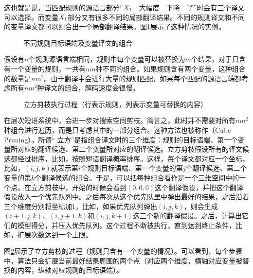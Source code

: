 \parinterval 这也就是说，当匹配规则的源语言部分“${X}_1$\ \ 大幅度\ \ 下降\ \ 了”时会有三个译文可以选择。而变量${X}_1$部分又有很多不同的局部翻译结果。不同的规则译文和不同的变量译文都可以组合出一个局部翻译结果。图\ref{fig:8-12}展示了这种情况的实例。

\begin{figure}[htp]
\centering

\caption{不同规则目标语端及变量译文的组合}
\label{fig:8-12}
\end{figure}

\parinterval 假设有$n$个规则源语言端相同，规则中每个变量可以被替换为$m$个结果，对于只含有一个变量的规则，一共有$nm$种不同的组合。如果规则含有两个变量，这种组合的数量是$n{m}^2$。由于翻译中会进行大量的规则匹配，如果每个匹配的源语言端都考虑所有$n{m}^2$种译文的组合，解码速度会很慢。

\begin{figure}[htp]
\centering

\caption{立方剪枝执行过程（行表示规则，列表示变量可替换的内容）}
\label{fig:8-13}
\end{figure}

\parinterval 在层次短语系统中，会进一步对搜索空间剪枝。简言之，此时并不需要对所有$n{m}^2$种组合进行遍历，而是只考虑其中的一部分组合。这种方法也被称作{\small{}}（Cube Pruning）。所谓“ 立方”是指组合译文时的三个维度：规则的目标语端、第一个变量所对应的翻译候选、第二个变量所对应的翻译候选。立方剪枝假设所有的译文候选都经过排序，比如，按照短语翻译概率排序。这样，每个译文都对应一个坐标，比如，$(i,j,k)$就表示第$i$个规则目标语端、第一个变量的第$j$个翻译候选、第二个变量的第$k$个翻译候选的组合。于是，可以把每种组合看作是一个三维空间中的一个点。在立方剪枝中，开始的时候会看到$(0,0,0)$这个翻译假设，并把这个翻译假设放入一个优先队列中。之后每次从这个优先队里中弹出最好的结果，之后沿着三个维度分别将坐标加1，比如，如果优先队列弹出$(i,j,k)$，则会生成$(i+1,j,k)$、$(i,j+1,k)$和$(i,j,k+1)$这三个新的翻译假设。之后，计算出它们的模型得分，并压入优先队列。这个过程不断被执行，直到达到终止条件，比如，扩展次数达到一个上限。

\parinterval 图\ref{fig:8-13}展示了立方剪枝的过程（规则只含有一个变量的情况）。可以看到，每个步骤中，算法只会扩展当前最好结果周围的两个点（对应两个维度，横轴对应变量被替换的内容，纵轴对应规则的目标语端）。

